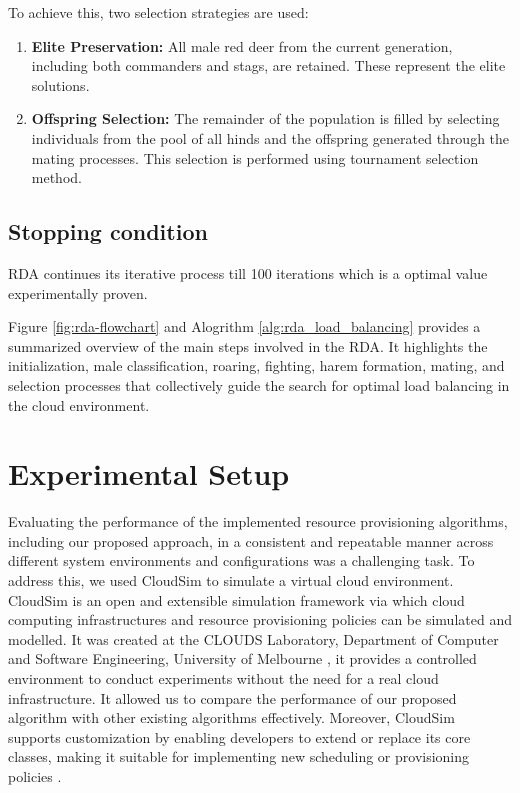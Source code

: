 \documentclass[pdflatex,sn-mathphys-num]{sn-jnl}%
\theoremstyle{thmstyleone}%
\theoremstyle{thmstyletwo}%
\theoremstyle{thmstylethree}%
\begin{document}
To achieve this, two selection strategies are used:

\begin{enumerate}
    \item \textbf{Elite Preservation:} All male red deer from the current generation, including both commanders and stags, are retained. These represent the elite solutions.
    
    \item \textbf{Offspring Selection:} The remainder of the population is filled by selecting individuals from the pool of all hinds and the offspring generated through the mating processes. This selection is performed using tournament selection method.
\end{enumerate}

\subsection{Stopping condition}\label{subsec4.10}
RDA continues its iterative process till 100 iterations which is a optimal value experimentally proven\cite{red_deer}.

Figure \ref{fig:rda-flowchart} and Alogrithm \ref{alg:rda_load_balancing} provides a summarized overview of the main steps involved in the RDA. It highlights the initialization, male classification, roaring, fighting, harem formation, mating, and selection processes that collectively guide the search for optimal load balancing in the cloud environment.


\section{Experimental Setup}\label{sec5}

Evaluating the performance of the implemented resource provisioning algorithms, including our proposed approach, in a consistent and repeatable manner across different system environments and configurations was a challenging task. To address this, we used CloudSim to simulate a virtual cloud environment. CloudSim is an open and extensible simulation framework via which cloud computing infrastructures and resource provisioning policies can be simulated and modelled. It was created at the CLOUDS Laboratory, Department of Computer and Software Engineering, University of Melbourne \cite{cloudsim}, it provides a controlled environment to conduct experiments without the need for a real cloud infrastructure. It allowed us to compare the performance of our proposed algorithm with other existing algorithms effectively. Moreover, CloudSim supports customization by enabling developers to extend or replace its core classes, making it suitable for implementing new scheduling or provisioning policies \cite{cloud-sim-ref-2}.
\end{document}
